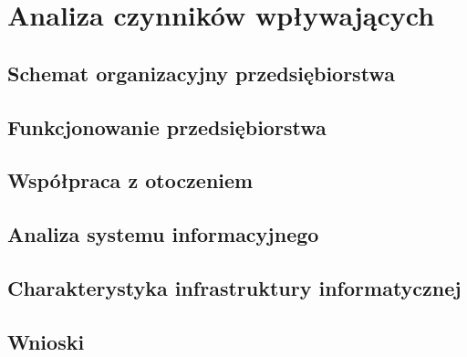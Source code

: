 \section{Analiza czynników wpływających}

\subsection{Schemat organizacyjny przedsiębiorstwa}

\subsection{Funkcjonowanie przedsiębiorstwa}

\subsection{Współpraca z otoczeniem}

\subsection{Analiza systemu informacyjnego}

\subsection{Charakterystyka infrastruktury informatycznej}

\subsection{Wnioski}

\newpage
